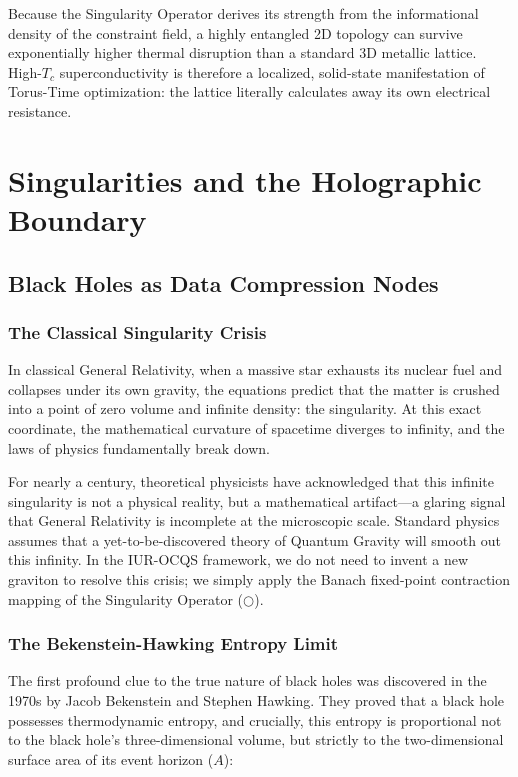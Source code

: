 \documentclass[12pt,openany]{book}
\begin{document}
Because the Singularity Operator derives its strength from the informational density of the constraint field, a highly entangled 2D topology can survive exponentially higher thermal disruption than a standard 3D metallic lattice. High-$T_c$ superconductivity is therefore a localized, solid-state manifestation of Torus-Time optimization: the lattice literally calculates away its own electrical resistance.

\part{Singularities and the Holographic Boundary}

\chapter{Black Holes as Data Compression Nodes}

\section{The Classical Singularity Crisis}
In classical General Relativity, when a massive star exhausts its nuclear fuel and collapses under its own gravity, the equations predict that the matter is crushed into a point of zero volume and infinite density: the singularity. At this exact coordinate, the mathematical curvature of spacetime diverges to infinity, and the laws of physics fundamentally break down.

For nearly a century, theoretical physicists have acknowledged that this infinite singularity is not a physical reality, but a mathematical artifact—a glaring signal that General Relativity is incomplete at the microscopic scale. Standard physics assumes that a yet-to-be-discovered theory of Quantum Gravity will smooth out this infinity. In the IUR-OCQS framework, we do not need to invent a new graviton to resolve this crisis; we simply apply the Banach fixed-point contraction mapping of the Singularity Operator ($\bigcirc$).

\section{The Bekenstein-Hawking Entropy Limit}
The first profound clue to the true nature of black holes was discovered in the 1970s by Jacob Bekenstein and Stephen Hawking. They proved that a black hole possesses thermodynamic entropy, and crucially, this entropy is proportional not to the black hole's three-dimensional volume, but strictly to the two-dimensional surface area of its event horizon ($A$):
\end{document}

